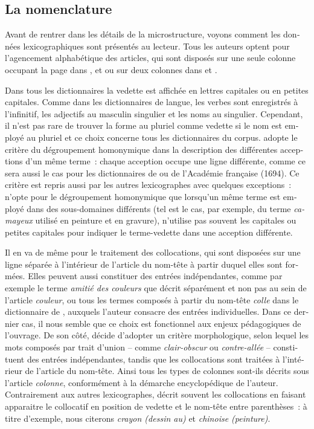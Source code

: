 \documentclass[output=paper,colorlinks,citecolor=brown,arabicfont,chinesefont,booklanguage=french]{langscibook}
\begin{document}
\begin{otherlanguage}{french}
\subsection{La nomenclature}

Avant de rentrer dans les détails de la microstructure, voyons comment les données lexicographiques sont présentés au lecteur. Tous les auteurs optent pour l’agencement alphabétique des articles, qui sont disposés sur une seule colonne occupant la page dans \citet{Felibien1676}, \citet{Marsy1746} et \citet{Boutard1826} ou sur deux colonnes dans \citet{Lacombe1752} et \citet{Pernety1757}.

Dans tous les dictionnaires la vedette est affichée en lettres capitales ou en petites capitales. Comme dans les dictionnaires de langue, les verbes sont enregistrés à l’infinitif, les adjectifs au masculin singulier et les noms au singulier. Cependant, il n’est pas rare de trouver la forme au pluriel comme vedette si le nom est employé au pluriel et ce choix concerne tous les dictionnaires du corpus. \citet{Felibien1676} adopte le critère du dégroupement homonymique \citep{Pruvost2006} dans la description des différentes acceptions d’un même terme~: chaque acception occupe une ligne différente, comme ce sera aussi le cas pour les dictionnaires de \citet{Richelet1680} ou de l’Académie française (1694). Ce critère est repris aussi par les autres lexicographes avec quelques exceptions~: \citet{Lacombe1752} n’opte pour le dégroupement homonymique que lorsqu’un même terme est employé dans des sous-domaines différents (tel est le cas, par exemple, du terme \emph{camayeux} utilisé en peinture et en gravure), \citet{Boutard1826} n’utilise pas souvent les capitales ou petites capitales pour indiquer le terme-vedette dans une acception différente.

Il en va de même pour le traitement des collocations, qui sont disposées sur une ligne séparée à l’intérieur de l’article du nom-tête à partir duquel elles sont formées. Elles peuvent aussi constituer des entrées indépendantes, comme par exemple le terme \emph{amitié des couleurs} que \citet{Felibien1676} décrit séparément et non pas au sein de l’article \emph{couleur}, ou tous les termes composés à partir du nom-tête \emph{colle} dans le dictionnaire de \citet{Pernety1757}, auxquels l’auteur consacre des entrées individuelles. Dans ce dernier cas, il nous semble que ce choix est fonctionnel aux enjeux pédagogiques de l’ouvrage. De son côté, \citet{Boutard1826} décide d’adopter un critère morphologique, selon lequel les mots composés par trait d’union – comme \emph{clair-obscur} ou \emph{contre-allée} – constituent des entrées indépendantes, tandis que les collocations sont traitées à l’intérieur de l’article du nom-tête. Ainsi tous les types de colonnes sont-ils décrits sous l’article \emph{colonne}, conformément à la démarche encyclopédique de l’auteur. Contrairement aux autres lexicographes, \citealt{Lacombe1752} décrit souvent les collocations en faisant apparaitre le collocatif en position de vedette et le nom-tête entre parenthèses~: à titre d’exemple, nous citerons \emph{crayon (dessin au)} et \emph{chinoise (peinture)}.


\end{otherlanguage}
\end{document}
